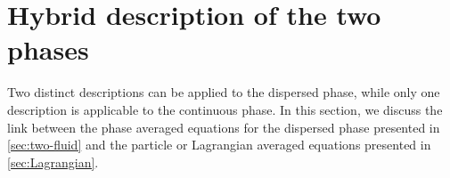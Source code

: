 \section{Hybrid description of the two phases}
\label{sec:averaged_eq}

Two distinct descriptions can be applied to the dispersed phase, while only one description is applicable to the continuous phase. 
In this section, %
we discuss the link between  the phase averaged equations for the dispersed phase presented in \ref{sec:two-fluid} and the particle or Lagrangian averaged equations presented in \ref{sec:Lagrangian}.




 



